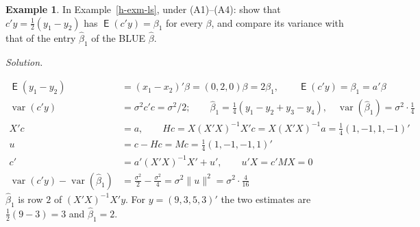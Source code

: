 \documentclass[12pt]{article}
\DeclareMathOperator\expc{\mathsf{E}}
\DeclareMathOperator\var{var}
\theoremstyle{definition}
\newtheorem{example}[theorem]{Example}
\newcommand{\boardtop}{\vspace*{-\abovedisplayskip}}
\begin{document}
\begin{example}\label{h-exm-blue}
In Example~\ref{h-exm-ls}, under (A1)--(A4): show that \(c'y=\frac12(y_1-y_2)\) has \(\expc(c'y)=\beta_1\) for every
\(\beta\), and compare its variance with that of the entry \(\hat\beta_1\) of the BLUE \(\hat\beta\).
\end{example}
\textit{Solution.}
\begin{board}[\(x_1'=(1,2,3)\), \(x_2'=(1,0,3)\), \(c=\frac12(1,-1,0,0)'\), \(a=(0,1,0)'\); (A1), (A3), \lec{9},
\lit{Theorem~3}(b); Theorem~\ref{h-thm-unbiased}(b) for \(\var(\hat\beta_1)\); \(M'=M\), \(MX=0\)
(Theorem~\ref{h-thm-hat}(c)):]
\boardtop
\begin{align*}
\expc(y_1-y_2)&=(x_1-x_2)'\beta=(0,2,0)\beta=2\beta_1,\qquad\expc(c'y)=\beta_1=a'\beta\\
\var(c'y)&=\sigma^2c'c=\sigma^2/2;\qquad\hat\beta_1=\tfrac14(y_1-y_2+y_3-y_4),\quad\var(\hat\beta_1)=\sigma^2\cdot\tfrac14\\
X'c&=a,\qquad Hc=X(X'X)^{-1}X'c=X(X'X)^{-1}a=\tfrac14(1,-1,1,-1)'\\
u&=c-Hc=Mc=\tfrac14(1,-1,-1,1)'\\
c'&=a'(X'X)^{-1}X'+u',\qquad u'X=c'MX=0\\
\var(c'y)-\var(\hat\beta_1)&=\frac{\sigma^2}2-\frac{\sigma^2}4=\sigma^2\lVert u\rVert^2=\sigma^2\cdot\tfrac4{16}
\end{align*}
\(\hat\beta_1\) is row \(2\) of \((X'X)^{-1}X'y\). For \(y=(9,3,5,3)'\) the two estimates are \(\frac12(9-3)=3\) and
\(\hat\beta_1=2\).
\end{board}
\end{document}
